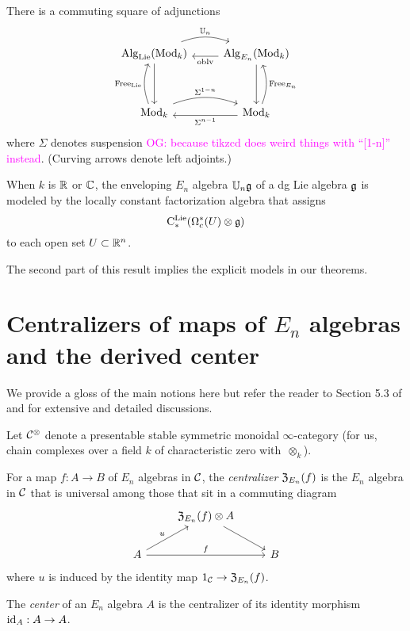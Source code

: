 \documentclass[11pt]{amsart}
\numberwithin{equation}{section}
\def\owen{\textcolor{magenta}{OG: }\textcolor{magenta}}
\begin{document}
\begin{thm}
There is a commuting square of adjunctions
\[
\begin{tikzcd}
\Alg_\Lie(\Mod_k) \arrow[r, bend left=20, shift left=.5ex,"\UU_n"] \arrow[dd] & \Alg_{E_n}(\Mod_k) \arrow[l, shift left=.5ex, "\oblv"] \arrow[dd]\\
&\\
\Mod_k \arrow[r, bend left=20, shift left=.5ex, "\Sigma^{1-n}"] \arrow[uu, bend left=20, shift left=.5ex, "\Free_\Lie"] & \Mod_k \arrow[l, shift left=.5ex,"\Sigma^{n-1}"] \arrow[uu, bend right=20, shift right=.5ex, "\Free_{E_n}"']
\end{tikzcd}
\]
where $\Sigma$ denotes suspension \owen{because tikzcd does weird things with ``[1-n]'' instead}.
(Curving arrows denote left adjoints.)

When $k$ is $\mathbb R$ or $\mathbb C$, 
the enveloping $E_n$ algebra $\mathbb U_n \mathfrak g$ of a dg Lie algebra $\mathfrak g$ is modeled by the locally constant factorization algebra that assigns
\[
{\rm C}^{\rm Lie}_*(\Omega^*_c(U) \otimes \mathfrak g)
\]
to each open set $U \subset \mathbb R^n$.
\end{thm}

The second part of this result implies the explicit models in our theorems.

\section{Centralizers of maps of $E_n$ algebras and the derived center}
\label{sec: centralizer}

We provide a gloss of the main notions here but refer the reader to Section 5.3 of \cite{LurieHA} and \cite{FrancisHH} for extensive and detailed discussions.

Let $\mathcal C^\otimes$ denote a presentable stable symmetric monoidal $\infty$-category (for us, chain complexes over a field $k$ of characteristic zero with~$\otimes_k$).

\begin{dfn}
For a map $f: A \to B$ of $E_n$ algebras in $\mathcal C$, 
the {\em centralizer} ${\frak Z}_{E_n}(f)$ is the $E_n$ algebra in $\mathcal C$ that is universal among those that sit in a commuting diagram
\[
\begin{tikzcd}
& {\frak Z}_{E_n}(f) \otimes A \arrow[dr] & \\
A \arrow[ur, "u"] \arrow[rr, "f"] && B
\end{tikzcd}
\]
where $u$ is induced by the identity map $1_\mathcal C \to {\frak Z}_{E_n}(f)$.

The {\em center} of an $E_n$ algebra $A$ is the centralizer of its identity morphism ${\rm id}_A: A \to A$.
\end{dfn}
\end{document}
